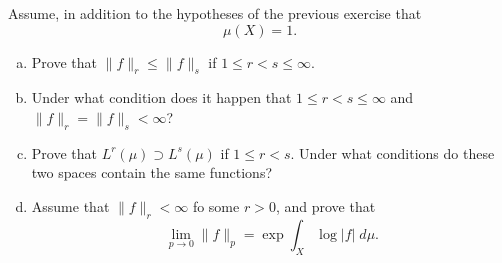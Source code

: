 \documentclass[11pt,letterpaper]{article}
\begin{document}
\begin{problem}
    Assume, in addition to the hypotheses of the previous exercise that
    \[
        \mu(X)=1
    .\] 
    \begin{enumerate}[(a)]
        \item Prove that $\|f\|_r\leq \|f\|_s$ if $1\leq r<s \leq \infty$.
        \item Under what condition does it happen that $1\leq r < s \leq \infty$ and $\|f\|_r =\|f\|_s < \infty$?
        \item Prove that $L^r(\mu)\supset L^s(\mu)$ if $1 \leq r < s$. Under what conditions do these two spaces contain the same functions?
        \item Assume that $\|f\|_r < \infty$ fo some $r>0$, and prove that
        \[
            \lim_{p \to 0} \|f\|_p = \exp \int_X \log |f|\; d\mu
        .\] 
    \end{enumerate}
\end{problem}
\end{document}
